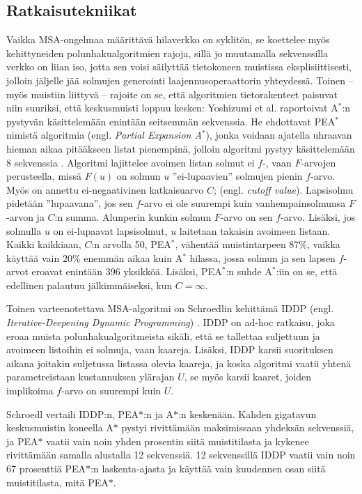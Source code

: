\documentclass[finnish]{tktltiki2}
\theoremstyle{definition}
\theoremstyle{remark}
\begin{document}
\subsection{Ratkaisutekniikat}
Vaikka MSA-ongelmaa määrittävä hilaverkko on syklitön, se koettelee myös kehittyneiden polunhakualgoritmien rajoja, sillä jo muutamalla sekvenssilla verkko on liian iso, jotta sen voisi säilyttää tietokoneen muistissa eksplisiittisesti, jolloin jäljelle jää solmujen generointi laajennusoperaattorin yhteydessä. Toinen -- myös muistiin liittyvä -- rajoite on se, että algoritmien tietorakenteet paisuvat niin suuriksi, että keskusmuisti loppuu kesken: Yoshizumi et al. raportoivat A$^{\ast}$:n pystyvän käsittelemään enintään seitsemmän sekvenssia. He ehdottavat PEA$^{\ast}$ nimistä algoritmia (engl. \textit{Partial Expansion A}$^\ast$), jonka voidaan ajatella uhraavan hieman aikaa pitääkseen listat pienempinä, jolloin algoritmi pystyy käsittelemään 8 sekvenssia \cite{Yoshizumi00}. Algoritmi lajittelee avoimen listan solmut ei $f$-, vaan $F$-arvojen perusteella, missä $F(u)$ on solmun $u$ ''ei-lupaavien'' solmujen pienin $f$-arvo. Myös on annettu ei-negaativinen katkaisuarvo $C$; (engl. \textit{cutoff value}). Lapsisolmu pidetään ''lupaavana'', jos sen $f$-arvo ei ole suurempi kuin vanhempainsolmunsa $F$-arvon ja $C$:n summa. Alunperin kunkin solmun $F$-arvo on sen $f$-arvo. Lisäksi, jos solmulla $u$ on ei-lupaavat lapsisolmut, $u$ laitetaan takaisin avoimeen listaan. Kaikki kaikkiaan, $C$:n arvolla 50, PEA$^{\ast}$, vähentää muistintarpeen 87\%, vaikka käyttää vain 20\% enemmän aikaa kuin A$^{\ast}$ hilassa, jossa solmun ja sen lapsen $f$-arvot eroavat enintään 396 yksikköä. Lisäksi, PEA$^{\ast}$:n suhde A$^{\ast}$:iin on se, että edellinen palautuu jälkimmäiseksi, kun $C = \infty$.

Toinen varteenotettava MSA-algoritmi on Schroedlin kehittämä IDDP (engl. \textit{Iterative-Deepening Dynamic Programming}) \cite{Schroedl05}. IDDP on ad-hoc ratkaisu, joka eroaa muista polunhakualgoritmeista sikäli, että se tallettaa suljettuun ja avoimeen listoihin ei solmuja, vaan kaareja. Lisäksi, IDDP karsii suorituksen aikana joitakin suljetussa listassa olevia kaareja, ja koska algoritmi vaatii yhtenä parametreistaan kustannuksen ylärajan $U$, se myös karsii kaaret, joiden implikoima $f$-arvo on suurempi kuin $U$.

Schroedl vertaili IDDP:n, PEA$\ast$:n ja A$\ast$:n keskenään. Kahden gigatavun keskusmuistin koneella A$\ast$ pystyi rivittämään maksimissaan yhdeksän sekvenssiä, ja PEA$\ast$ vaatii vain noin yhden prosentin siitä muistitilasta ja kykenee rivittämään samalla alustalla 12 sekvenssiä. 12 sekvenssillä IDDP vaatii vain noin 67 prosenttiä PEA$\ast$:n laskenta-ajasta ja käyttää vain kuudennen osan siitä muistitilasta, mitä PEA$\ast$.
\end{document}

